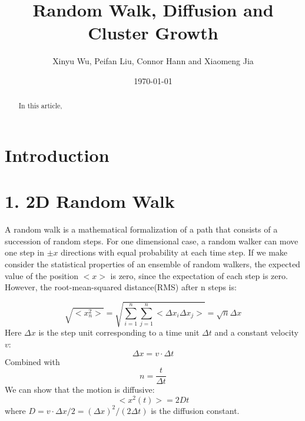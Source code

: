 \documentclass[aps,prl,preprint,superscriptaddress]{revtex4}
\begin{document}
	
	
	\title{Random Walk, Diffusion and Cluster Growth}%
	
	\author{Xinyu Wu, Peifan Liu, Connor Hann and Xiaomeng Jia}
	
	
	\date{\today}
	
	\begin{abstract}
		In this article,  
	\end{abstract}
	
	\maketitle
	
	\section{Introduction}  %
	
	
	
	\section{1. 2D Random Walk} 
	
	
	A random walk is a mathematical formalization of a path that consists of a succession of random steps. For one dimensional case, a random walker can move one step in $\pm x$ directions with equal probability at each time step. If we make consider the statistical properties of  an ensemble of random walkers, the expected value of the position $ <x> $ is zero, since the expectation of each step is zero. However, the root-mean-squared distance(RMS) after n steps is:
	
	\begin{equation}
	\sqrt{<x_n^2>} = \sqrt{\sum\limits_{i=1}^{n}\sum\limits_{j=1}^{n}<\Delta x_i\Delta x_j>} = \sqrt{n}\Delta x
	\end{equation} 
	Here $\Delta x$ is the step unit corresponding to a time unit $\Delta t$ and a constant velocity $v$:
	\begin{equation}
	\Delta x = v\cdot \Delta t
	\end{equation} 
	Combined with
	\begin{equation}
	n = \frac{t}{\Delta t}
	\end{equation}
	We can show that the motion is diffusive:
	\begin{equation}
	<x^2(t)> = 2Dt
	\end{equation}
	where $D = v\cdot\Delta x/2 = (\Delta x)^2/(2\Delta t)$ is the diffusion constant.
	
\end{document}
